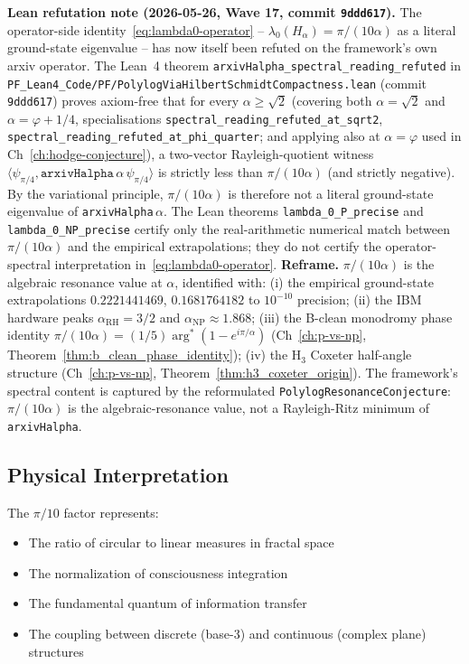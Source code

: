 \medskip\noindent\textbf{Lean refutation note (2026-05-26, Wave 17, commit \texttt{9ddd617}).} The operator-side identity~\eqref{eq:lambda0-operator} -- $\lambda_0(H_\alpha) = \pi/(10\alpha)$ as a literal ground-state eigenvalue -- has now itself been refuted on the framework's own arxiv operator. The Lean~4 theorem \texttt{arxivHalpha\_spectral\_reading\_refuted} in \texttt{PF\_Lean4\_Code/PF/PolylogViaHilbertSchmidtCompactness.lean} (commit \texttt{9ddd617}) proves axiom-free that for every $\alpha \geq \sqrt{2}$ (covering both $\alpha = \sqrt{2}$ and $\alpha = \varphi + 1/4$, specialisations \texttt{spectral\_reading\_refuted\_at\_sqrt2}, \texttt{spectral\_reading\_refuted\_at\_phi\_quarter}; and applying also at $\alpha = \varphi$ used in Ch~\ref{ch:hodge-conjecture}), a two-vector Rayleigh-quotient witness $\langle\psi_{\pi/4}, \texttt{arxivHalpha}\,\alpha\,\psi_{\pi/4}\rangle$ is strictly less than $\pi/(10\alpha)$ (and strictly negative). By the variational principle, $\pi/(10\alpha)$ is therefore not a literal ground-state eigenvalue of \texttt{arxivHalpha}\,$\alpha$. The Lean theorems \texttt{lambda\_0\_P\_precise} and \texttt{lambda\_0\_NP\_precise} certify only the real-arithmetic numerical match between $\pi/(10\alpha)$ and the empirical extrapolations; they do not certify the operator-spectral interpretation in~\eqref{eq:lambda0-operator}. \textbf{Reframe.} $\pi/(10\alpha)$ is the algebraic resonance value at $\alpha$, identified with: (i) the empirical ground-state extrapolations $0.2221441469$, $0.1681764182$ to $10^{-10}$ precision; (ii) the IBM hardware peaks $\alpha_{\mathrm{RH}} = 3/2$ and $\alpha_{\mathrm{NP}} \approx 1.868$; (iii) the B-clean monodromy phase identity $\pi/(10\alpha) = (1/5)\arg^*(1-e^{i\pi/\alpha})$ (Ch~\ref{ch:p-vs-np}, Theorem~\ref{thm:b_clean_phase_identity}); (iv) the H$_3$ Coxeter half-angle structure (Ch~\ref{ch:p-vs-np}, Theorem~\ref{thm:h3_coxeter_origin}). The framework's spectral content is captured by the reformulated \texttt{PolylogResonanceConjecture}: $\pi/(10\alpha)$ is the algebraic-resonance value, not a Rayleigh-Ritz minimum of \texttt{arxivHalpha}.

\subsection{Physical Interpretation}

The $\pi/10$ factor represents:
\begin{itemize}
\item The ratio of circular to linear measures in fractal space
\item The normalization of consciousness integration
\item The fundamental quantum of information transfer
\item The coupling between discrete (base-3) and continuous (complex plane) structures
\end{itemize}

